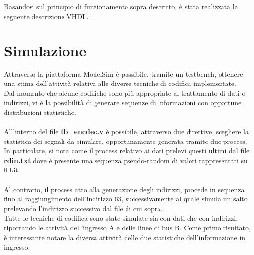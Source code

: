 \documentclass[11pt,  english, makeidx, a4paper, titlepage, oneside]{book}
\newenvironment{listato}{\footnotesize} {\normalsize }
\begin{document}
\begin{itemize}
\\\\
Basandosi sul principio di funzionamento sopra descritto, è stata realizzata la seguente descrizione VHDL.
\begin{center}
\begin{listato}
	\centerline{}
\end{listato}
\end{center}
\end{itemize}
\section{Simulazione}
Attraverso la piattaforma ModelSim è possibile, tramite un testbench, ottenere una stima dell'attività relativa alle diverse tecniche di codifica implementate.
\\
Dal momento che alcune codifiche sono più appropriate al trattamento di dati o indirizzi, vi è la possibilità di generare sequenze di informazioni con opportune distribuzioni statistiche.
\\\\
All'interno del file \textbf{tb\_encdec.v} è possibile, attraverso due direttive, scegliere la statistica dei segnali da simulare, opportunamente generata tramite due process. In particolare, si nota come il process relativo ai dati prelevi questi ultimi dal file \textbf{rdin.txt} dove è presente una sequenza pseudo-random di valori rappresentati su 8 bit.
\\\\
Al contrario, il process atto alla generazione degli indirizzi, procede in sequenza fino al raggiungimento dell'indirizzo 63, successivamente al quale simula un salto prelevando l'indirizzo successivo dal file di cui sopra.
\\
Tutte le tecniche di codifica sono state simulate sia con dati che con indirizzi, riportando le attività dell'ingresso A e delle linee di bus B. Come primo risultato, è interessante notare la diversa attività delle due statistiche dell'informazione in ingresso.
\\\\
\end{document}
